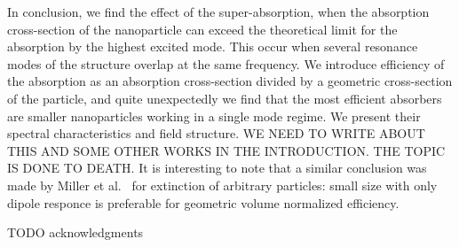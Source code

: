 \documentclass[aps,prl,twocolumn,showpacs,superscriptaddress,groupedaddress]{revtex4-1}
\begin{document}
In conclusion, we find the effect of the super-absorption, when the
absorption cross-section of the nanoparticle can exceed the
theoretical limit for the absorption by the highest excited mode. This
occur when several resonance modes of the structure overlap at the
same frequency. We introduce efficiency of the absorption as an
absorption cross-section divided by a geometric cross-section of the
particle, and quite unexpectedly we find that the most efficient
absorbers are smaller nanoparticles working in a single mode
regime. We present their spectral characteristics and field structure.
WE NEED TO WRITE ABOUT THIS AND SOME OTHER WORKS IN THE
INTRODUCTION. THE TOPIC IS DONE TO DEATH. 
It is interesting to note that a similar conclusion was made by Miller et
al.~\cite{Miller-2014} for extinction of arbitrary particles: small
size with only dipole responce is preferable for geometric volume
normalized efficiency.


\begin{acknowledgments}

  TODO acknowledgments
\end{acknowledgments}


\end{document}

